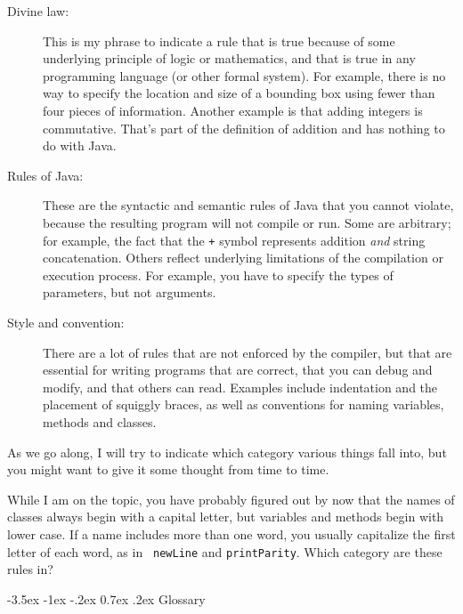 \documentclass{book}
\makeatletter
\renewcommand{\section}{\@startsection 
    {section} {1} {0mm}%
    {-3.5ex \@plus -1ex \@minus -.2ex}%
    {0.7ex \@plus.2ex}%
    {\normalfont\Large\bfseries}}
\makeatother
\begin{document}
\begin{description}

\item[Divine law:]  This is my phrase to indicate a rule that
is true because of some underlying principle of logic or
mathematics, and that is true in any programming language
(or other formal system).  For example, there is no way to
specify the location and size of a bounding box using fewer
than four pieces of information.  Another example is that adding
integers is commutative.  That's part of the definition of
addition and has nothing to do with Java.

\item[Rules of Java:]  These are the syntactic and semantic
rules of Java that you cannot violate, because the
resulting program will not compile or run.  Some are arbitrary;
for example, the fact that the {\tt +} symbol represents
addition {\em and} string concatenation.  Others reflect
underlying limitations of the compilation or execution process.
For example, you have to specify the types of parameters, but
not arguments.

\item[Style and convention:]  There are a lot of rules that
are not enforced by the compiler, but that are essential for
writing programs that are correct, that you can debug and
modify, and that others can read.  Examples include indentation
and the placement of squiggly braces, as well as conventions
for naming variables, methods and classes.

\end{description}

As we go along, I will try to indicate which category various things
fall into, but you might want to give it some thought from time to
time.

While I am on the topic, you have probably figured out by now that the
names of classes always begin with a capital letter, but variables and
methods begin with lower case.  If a name includes more than one word,
you usually capitalize the first letter of each word, as in {\tt
newLine} and {\tt printParity}.  Which category are these rules in?

\section{Glossary}
\end{document}
